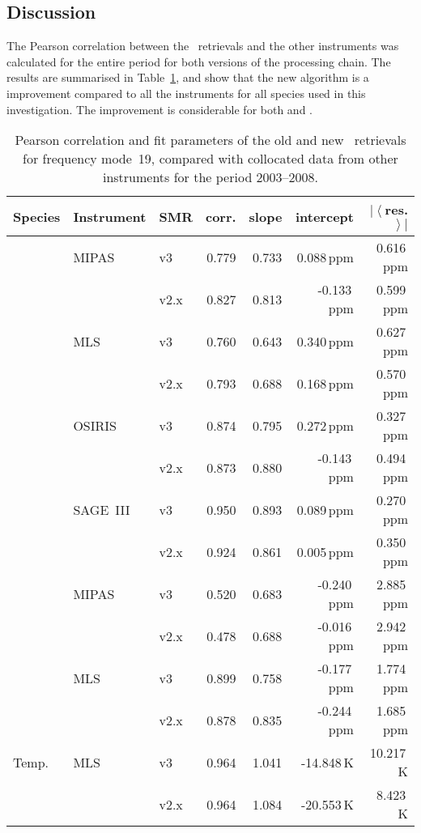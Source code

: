 \subsection{Discussion}
\label{sec:fm19:discussion}
The Pearson correlation between the \smr\ retrievals and the other instruments
was calculated for the entire period for both versions of the processing chain.
The results are summarised in Table~\ref{tab:fm19:stats}, and show that the
new algorithm is a improvement compared to all the instruments for all species
used in this investigation. The improvement is considerable for both 
and .


\begin{table}[hbt]
\centering
\caption{Pearson correlation and fit parameters of the old and new \smr\
retrievals for frequency mode~19, compared with collocated data from other
instruments for the period 2003--2008.
}
\label{tab:fm19:stats}
\begin{tabular}{lllrrrr}
    \toprule
    \textbf{Species} & \textbf{Instrument} & \textbf{SMR} & \textbf{corr.} & \textbf{slope} & \textbf{intercept} & \textbf{$\left|\left<\right.\right.$res.$\left.\left.\right>\right|$} \\
    \midrule
    \chem{O3}   & MIPAS     & v3    & 0.779 & 0.733 & 0.088\,ppm    & 0.616\,ppm \\
                &           & v2.x  & 0.827 & 0.813 & -0.133\,ppm   & 0.599\,ppm \\
    \cline{2-7}
                & MLS       & v3    & 0.760 & 0.643 & 0.340\,ppm    & 0.627\,ppm \\
                &           & v2.x  & 0.793 & 0.688 & 0.168\,ppm    & 0.570\,ppm \\
    \cline{2-7}
                & OSIRIS    & v3    & 0.874 & 0.795 & 0.272\,ppm    & 0.327\,ppm \\
                &           & v2.x  & 0.873 & 0.880 & -0.143\,ppm   & 0.494\,ppm \\
    \cline{2-7}
                & SAGE~III  & v3    & 0.950 & 0.893 & 0.089\,ppm    & 0.270\,ppm \\
                &           & v2.x  & 0.924 & 0.861 & 0.005\,ppm    & 0.350\,ppm \\
    \midrule
    \chem{H_2O} & MIPAS     & v3    & 0.520 & 0.683 & -0.240\,ppm   & 2.885\,ppm \\
                &           & v2.x  & 0.478 & 0.688 & -0.016\,ppm   & 2.942\,ppm \\
    \cline{2-7}
                & MLS       & v3    & 0.899 & 0.758 & -0.177\,ppm   & 1.774\,ppm \\
                &           & v2.x  & 0.878 & 0.835 & -0.244\,ppm   & 1.685\,ppm \\
    \midrule
    Temp.       & MLS       & v3    & 0.964 & 1.041 & -14.848\,K    & 10.217\,K \\
                &           & v2.x  & 0.964 & 1.084 & -20.553\,K    &  8.423\,K \\
    \bottomrule
\end{tabular}
\end{table}

